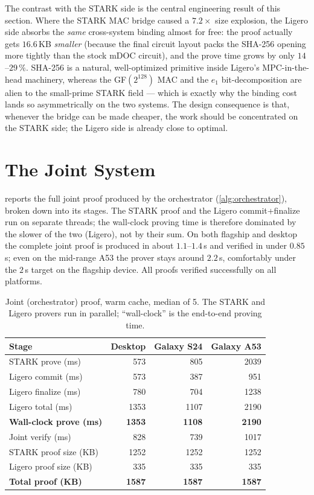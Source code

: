 \documentclass[binding=0.6cm,oneside,noexaminfo]{sapthesis}
\begin{document}
The contrast with the STARK side is the central engineering result of this
section. Where the STARK MAC bridge caused a $7.2\times$ size explosion, the
Ligero side absorbs the \emph{same} cross-system binding almost for free: the
proof actually gets $16.6$\,KB \emph{smaller} (because the final circuit layout
packs the SHA-256 opening more tightly than the stock mDOC circuit), and the prove
time grows by only $14$--$29\,\%$. SHA-256 is a natural, well-optimized primitive
inside Ligero's MPC-in-the-head machinery, whereas the GF$(2^{128})$ MAC and the
$e_1$ bit-decomposition are alien to the small-prime STARK field --- which is
exactly why the binding cost lands so asymmetrically on the two systems. The
design consequence is that, whenever the bridge can be made cheaper, the work
should be concentrated on the STARK side; the Ligero side is already close to
optimal.

\section{The Joint System}
\label{results:joint}
 reports the full joint proof produced by the
orchestrator (\cref{alg:orchestrator}), broken down into its stages. The STARK
proof and the Ligero commit+finalize run on separate threads; the wall-clock
proving time is therefore dominated by the slower of the two (Ligero), not by
their sum. On both flagship and desktop the complete joint proof is produced in
about $1.1$--$1.4$\,s and verified in under $0.85$\,s; even on the mid-range
A53 the prover stays around $2.2$\,s, comfortably under the $2$\,s target on the
flagship device. All proofs verified successfully on all platforms.

\begin{table}[ht]
  \centering
  \caption{Joint (orchestrator) proof, warm cache, median of 5. The STARK and
  Ligero provers run in parallel; ``wall-clock'' is the end-to-end proving time.}
  \label{tab:res-orchestrator}
  \small
  \begin{tabular}{@{}lrrr@{}}
    \toprule
    \textbf{Stage} & \textbf{Desktop} & \textbf{Galaxy S24} & \textbf{Galaxy A53} \\
    \midrule
    STARK prove (ms)            & 573  & 805  & 2039 \\
    Ligero commit (ms)          & 573  & 387  & 951  \\
    Ligero finalize (ms)        & 780  & 704  & 1238 \\
    Ligero total (ms)           & 1353 & 1107 & 2190 \\
    \textbf{Wall-clock prove (ms)} & \textbf{1353} & \textbf{1108} & \textbf{2190} \\
    Joint verify (ms)           & 828  & 739  & 1017 \\
    \midrule
    STARK proof size (KB)       & 1252 & 1252 & 1252 \\
    Ligero proof size (KB)      & 335  & 335  & 335  \\
    \textbf{Total proof (KB)}   & \textbf{1587} & \textbf{1587} & \textbf{1587} \\
    \bottomrule
  \end{tabular}
\end{table}
\end{document}
